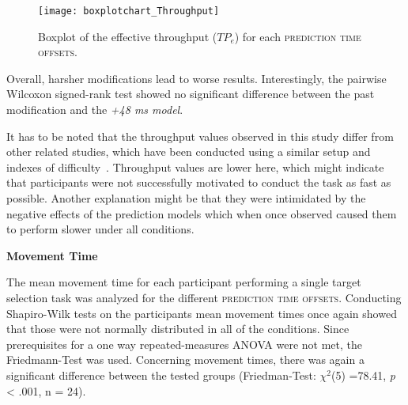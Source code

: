 \documentclass[sigconf]{acmart}
\begin{document}
\begin{figure}[H]
  \texttt{[image: boxplotchart\_Throughput]}
  \caption{Boxplot of the effective throughput ($TP_e$) for each  \textsc{prediction time offsets}. }
  \label{fig:bp_throughhput}
\end{figure}


Overall, harsher modifications lead to worse results. Interestingly, the pairwise Wilcoxon signed-rank test showed no significant difference between the past modification and the \textit{+48 ms model}.

It has to be noted that the throughput values observed in this study differ from other related studies, which have been conducted using a similar setup and indexes of difficulty~\cite{Schwind2019a}. Throughput values are lower here, which might indicate that participants were not successfully motivated to conduct the task as fast as possible. Another explanation might be that they were intimidated by the negative effects of the prediction models which when once observed caused them to perform slower under all conditions.\newline


\textbf{Movement Time}

The mean movement time for each participant performing a single target selection task was analyzed for the different \textsc{prediction time offsets}. Conducting Shapiro-Wilk tests on the participants mean movement times once again showed that those were not normally distributed in all of the conditions. Since prerequisites for a one way repeated-measures ANOVA were not met, the Friedmann-Test was used. Concerning movement times, there was again a significant difference between the tested groups (Friedman-Test: $\chi^2$(5) =78.41, \textit{p} < .001, n = 24).
\end{document}
